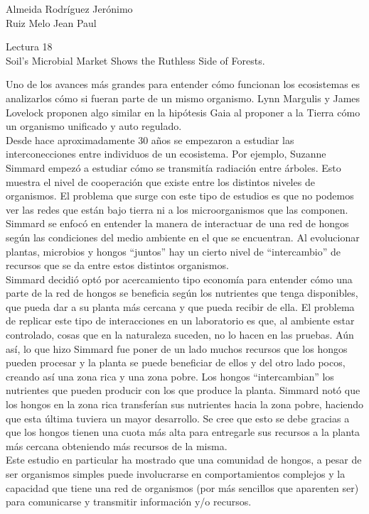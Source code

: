 \documentclass[a4paper, 12pt]{report}
\begin{document}
\begin{flushright}
    Almeida Rodríguez Jerónimo\\
    Ruiz Melo Jean Paul
\end{flushright}

\begin{center}
    {\LARGE Lectura 18}\\
    {\LARGE Soil’s Microbial Market Shows the Ruthless Side of Forests.}
\end{center}

Uno de los avances más grandes para entender cómo funcionan los ecosistemas es
analizarlos cómo si fueran parte de un mismo organismo. Lynn Margulis y James
Lovelock proponen algo similar en la hipótesis Gaia al proponer a la Tierra cómo
un organismo unificado y auto regulado.\\

Desde hace aproximadamente 30 años se empezaron a estudiar las interconecciones
entre individuos de un ecosistema. Por ejemplo, Suzanne Simmard empezó a
estudiar cómo se transmitía radiación entre árboles. Esto muestra el nivel de
cooperación que existe entre los distintos niveles de organismos. El problema
que surge con este tipo de estudios es que no podemos ver las redes que están
bajo tierra ni a los microorganismos que las componen.\\

Simmard se enfocó en entender la manera de interactuar de una red de hongos
según las condiciones del medio ambiente en el que se encuentran. Al evolucionar
plantas, microbios y hongos ``juntos'' hay un cierto nivel de ``intercambio'' de
recursos que se da entre estos distintos organismos.\\

Simmard decidió optó por acercamiento tipo economía para entender cómo una parte
de la red de hongos se beneficia según los nutrientes que tenga disponibles, que
pueda dar a su planta más cercana y que pueda recibir de ella. El problema de
replicar este tipo de interacciones en un laboratorio es que, al ambiente estar
controlado, cosas que en la naturaleza suceden, no lo hacen en las pruebas. Aún
así, lo que hizo Simmard fue poner de un lado muchos recursos que los hongos
pueden procesar y la planta se puede beneficiar de ellos y del otro lado pocos,
creando así una zona rica y una zona pobre. Los hongos ``intercambian'' los
nutrientes que pueden producir con los que produce la planta. Simmard notó que
los hongos en la zona rica transferían sus nutrientes hacia la zona pobre,
haciendo que esta última tuviera un mayor desarrollo. Se cree que esto se debe
gracias a que los hongos tienen una cuota más alta para entregarle sus recursos
a la planta más cercana obteniendo más recursos de la misma.\\

Este estudio en particular ha mostrado que una comunidad de hongos, a pesar de
ser organismos simples puede involucrarse en comportamientos complejos y la
capacidad que tiene una red de organismos (por más sencillos que aparenten ser)
para comunicarse y transmitir información y/o recursos.
\end{document}
